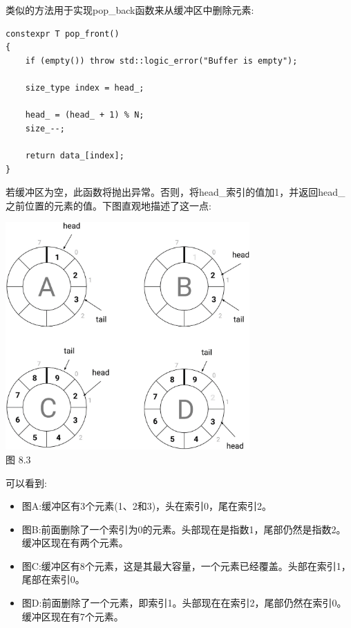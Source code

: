 类似的方法用于实现pop\_back函数来从缓冲区中删除元素:

\begin{lstlisting}[style=styleCXX]
constexpr T pop_front()
{
	if (empty()) throw std::logic_error("Buffer is empty");
	
	size_type index = head_;
	
	head_ = (head_ + 1) % N;
	size_--;
	
	return data_[index];
}
\end{lstlisting}

若缓冲区为空，此函数将抛出异常。否则，将head\_索引的值加1，并返回head\_之前位置的元素的值。下图直观地描述了这一点:

\begin{center}
\includegraphics[width=0.7\textwidth]{content/3/chapter8/images/3.png}\\
图 8.3
\end{center}

可以看到:

\begin{itemize}
\item
图A:缓冲区有3个元素(1、2和3)，头在索引0，尾在索引2。

\item
图B:前面删除了一个索引为0的元素。头部现在是指数1，尾部仍然是指数2。缓冲区现在有两个元素。

\item
图C:缓冲区有8个元素，这是其最大容量，一个元素已经覆盖。头部在索引1，尾部在索引0。

\item
图D:前面删除了一个元素，即索引1。头部现在在索引2，尾部仍然在索引0。缓冲区现在有7个元素。
\end{itemize}

